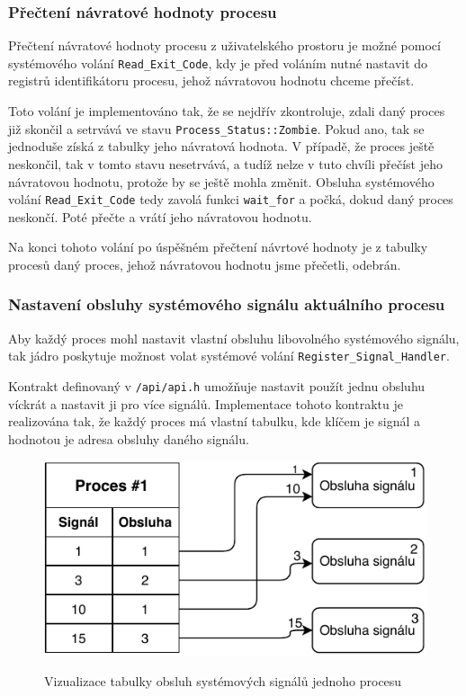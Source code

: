 \documentclass[12pt, a4paper]{article}
\begin{document}
\subsubsection{Přečtení návratové hodnoty procesu}
Přečtení návratové hodnoty procesu z uživatelského prostoru je možné pomocí systémového volání \texttt{Read\_Exit\_Code}, kdy je před voláním nutné nastavit do registrů identifikátoru procesu, jehož návratovou hodnotu chceme přečíst.

Toto volání je implementováno tak, že se nejdřív zkontroluje, zdali daný proces již skončil a setrvává ve stavu \texttt{Process\_Status::Zombie}. Pokud ano, tak se jednoduše získá z tabulky jeho návratová hodnota. V případě, že proces ještě neskončil, tak v tomto stavu nesetrvává, a tudíž nelze v tuto chvíli přečíst jeho návratovou hodnotu, protože by se ještě mohla změnit. Obsluha systémového volání \texttt{Read\_Exit\_Code} tedy zavolá funkci \texttt{wait\_for} a počká, dokud daný proces neskončí. Poté přečte a vrátí jeho návratovou hodnotu.

 Na konci tohoto volání po úspěšném přečtení návrtové hodnoty je z tabulky procesů daný proces, jehož návratovou hodnotu jsme přečetli, odebrán.

\subsubsection{Nastavení obsluhy systémového signálu aktuálního procesu}
Aby každý proces mohl nastavit vlastní obsluhu libovolného systémového signálu, tak jádro poskytuje možnost volat systémové volání \texttt{Register\_Signal\_Handler}.

Kontrakt definovaný v \texttt{/api/api.h} umožňuje nastavit použít jednu obsluhu víckrát a nastavit ji pro více signálů. Implementace tohoto kontraktu je realizována tak, že každý proces má vlastní tabulku, kde klíčem je signál a hodnotou je adresa obsluhy daného signálu.

\begin{figure}[!ht]
\centering
{\includegraphics[width=11.5cm]{pdf/register_signal_handler.pdf}}
\caption{Vizualizace tabulky obsluh systémových signálů jednoho procesu}
\label{fig:screen-transition-diagram}
\end{figure}
\end{document}
